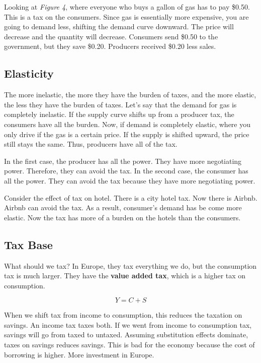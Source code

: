 \documentclass{article}
\begin{document}
Looking at \textit{Figure 4}, where everyone who buys a gallon of gas has to pay
\$0.50. This is a tax on the consumers. Since gas is essentially more expensive,
you are going to demand less, shifting the demand curve downward. The price will
decrease and the quantity will decrease. Consumers send \$0.50 to the
government, but they save \$0.20. Producers received \$0.20 less sales. 

\subsection{ Elasticity }

The more inelastic, the more they have the burden of taxes, and the more
elastic, the less they have the burden of taxes. Let's say that the demand for
gas is completely inelastic. If the supply curve shifts up from a producer tax,
the consumers have all the burden. Now, if demand is completely elastic, where
you only drive if the gas is a certain price. If the supply is shifted upward,
the price still stays the same. Thus, producers have all of the tax. 

In the first case, the producer has all the power. They have more negotiating
power. Therefore, they can avoid the tax. In the second case, the consumer has
all the power. They can avoid the tax because they have more negotiating power. 

Consider the effect of tax on hotel. There is a city hotel tax. Now there is
Airbnb. Airbnb can avoid the tax. As a result, consumer's demand has be come
more elastic. Now the tax has more of a burden on the hotels than the consumers.

\subsection{ Tax Base }

What should we tax? In Europe, they tax everything we do, but the consumption
tax is much larger. They have the \textbf{value added tax}, which is a higher
tax on consumption.

$$ Y = C + S $$

When we shift tax from income to consumption, this reduces the taxation on
savings. An income tax taxes both. If we went from income to consumption tax,
savings will go from taxed to untaxed. Assuming substitution effects dominate,
taxes on savings reduces savings. This is bad for the economy because the cost
of borrowing is higher. More investment in Europe.
\end{document}
